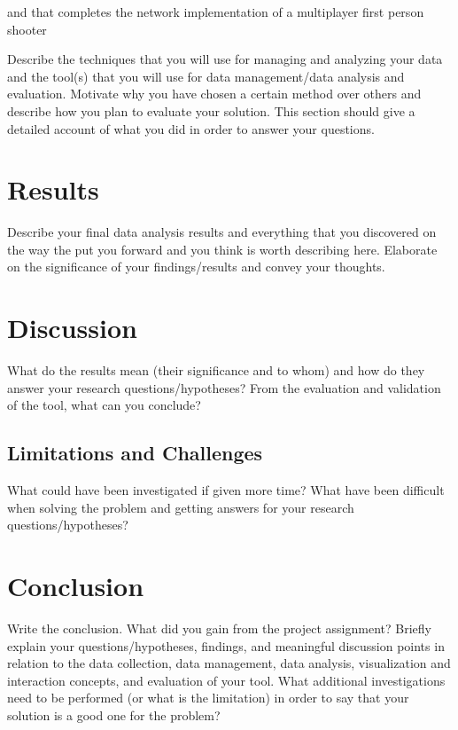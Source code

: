 and that completes the network implementation of a multiplayer first person shooter

    Describe the techniques that you will use for managing and analyzing your data and the tool(s) that you will use for data management/data analysis and evaluation. Motivate why you have chosen a certain method over others and describe how you plan to evaluate your solution. This section should give a detailed account of what you did in order to answer your questions.
    
    \section{Results}
    \label{chap:results}
    Describe your final data analysis results and everything that you discovered on the way the put you forward and you think is worth describing here. Elaborate on the significance of your findings/results and convey your thoughts. 
    
    \section{Discussion}
\label{chap:discussion}
What do the results mean (their significance and to whom) and how do they answer your research questions/hypotheses? From the evaluation and validation of the tool, what can you conclude? 

\subsection{Limitations and Challenges}
\label{sec:limitation}
What could have been investigated if given more time? What have been difficult when solving the problem and getting answers for your research questions/hypotheses?

\section{Conclusion}
\label{chap:conclusion}
Write the conclusion. What did you gain from the project assignment? Briefly explain your questions/hypotheses, findings, and meaningful discussion points in relation to the data collection, data management, data analysis, visualization and interaction concepts, and evaluation of your tool.
What additional investigations need to be performed (or what is the limitation) in order to say that your solution is a good one for the problem? 

